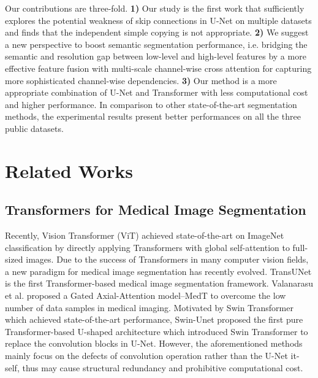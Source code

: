 \documentclass[letterpaper]{article} \usepackage{aaai22}  \usepackage{times}  \usepackage{helvet}  \usepackage{courier}  \usepackage[hyphens]{url}  \usepackage{graphicx} \urlstyle{rm} \def\UrlFont{\rm}  \usepackage{natbib}  \usepackage{caption} \DeclareCaptionStyle{ruled}{labelfont=normalfont,labelsep=colon,strut=off} \frenchspacing  \setlength{\pdfpagewidth}{8.5in}  \setlength{\pdfpageheight}{11in}  \usepackage{algorithm}
\begin{document}
	Our contributions are three-fold.
	\textbf{1)} Our study is the first work that sufficiently explores the potential weakness of skip connections in U-Net on multiple datasets and finds that the independent simple copying is not appropriate. 
	\textbf{2)} We suggest a new perspective to boost semantic segmentation performance, i.e. bridging the semantic and resolution gap between low-level and high-level features by a more effective feature fusion with multi-scale channel-wise cross attention for capturing more sophisticated channel-wise dependencies.
\textbf{3)} Our method is a more appropriate combination of U-Net and Transformer with less computational cost and higher performance. In comparison to other state-of-the-art segmentation methods, the experimental results present better performances on all the three public datasets.
	
	
	
	


	
	
	




	
	
	
	
	
	
	
	


	\section{Related Works}
	
	
	\subsection{Transformers for Medical Image Segmentation}
	Recently, Vision Transformer (ViT) \cite{ImageWorth16x16_2020} achieved state-of-the-art on ImageNet classification by directly applying Transformers with global self-attention to full-sized images.
	Due to the success of Transformers in many computer vision fields, a new paradigm for medical image segmentation has recently evolved\cite{RethinkingSemanticSegmentation_2020,MultiBranchHybridTransformer_2021, InstancebasedVisionTransformer_2021, MultiCompoundTransformerAccurate_2021, UTNetHybridTransformer_2021,TransFuseFusingTransformers_2021,UNETRTransformers3D_2021}.
	TransUNet \cite{TransUNetTransformersMake_2021} is the first Transformer-based medical image segmentation framework.
	Valanarasu et al. proposed a Gated Axial-Attention model–MedT \cite{MedicalTransformerGated_2021} to overcome the low number of data samples in medical imaging.
	Motivated by Swin Transformer \cite{SwinTransformerHierarchical_2021} which achieved state-of-the-art performance, Swin-Unet \cite{SwinUnetUnetlikePure_2021} proposed the first pure Transformer-based U-shaped architecture which introduced Swin Transformer to replace the convolution blocks in U-Net.
	However, the aforementioned methods mainly focus on the defects of convolution operation rather than the U-Net it-self, thus may cause structural redundancy and prohibitive computational cost.
	
\end{document}
